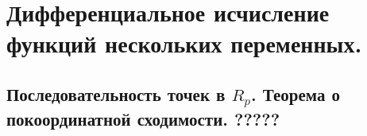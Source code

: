 {
\section{Дифференциальное исчисление функций нескольких переменных.}
\subsection{Последовательность точек в \( R_p \). Теорема о покоординатной сходимости. ?????}
}